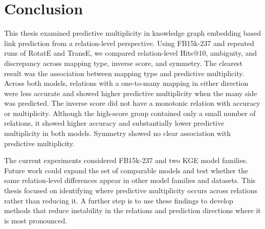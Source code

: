 \section{Conclusion}
\label{chap:conclusion}

This thesis examined predictive multiplicity in knowledge graph embedding
based link prediction from a relation-level perspective. Using FB15k-237 and
repeated runs of RotatE and TransE, we compared relation-level Hits@10,
ambiguity, and discrepancy across mapping type, inverse score, and symmetry.
The clearest result was the association between mapping type and predictive
multiplicity. Across both models, relations with a one-to-many mapping in
either direction were less accurate and showed higher predictive multiplicity
when the many side was predicted. The inverse score did not have a monotonic
relation with accuracy or multiplicity. Although the high-score group contained
only a small number of relations, it showed higher accuracy and substantially
lower predictive multiplicity in both models. Symmetry showed no clear
association with predictive multiplicity.

The current experiments considered FB15k-237 and two KGE model families.
Future work could expand the set of comparable models and test whether the
same relation-level differences appear in other model families and datasets.
This thesis focused on identifying where predictive multiplicity occurs across
relations rather than reducing it. A further step is to use these findings to
develop methods that reduce instability in the relations and prediction
directions where it is most pronounced.
